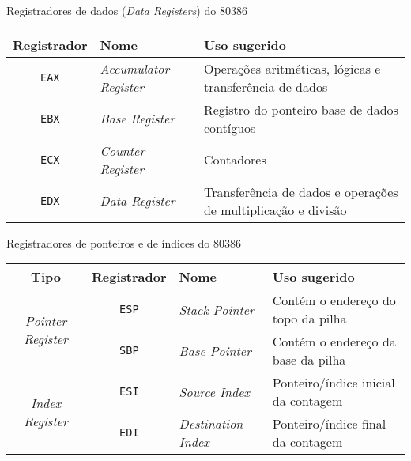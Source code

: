 \begin{frame}[fragile]{Registradores de dados ({\it Data Registers}) do 80386}

    \begin{table}[ht]
        \centering

        \begin{tabularx}{\textwidth}{clX}
            \toprule
            \textbf{Registrador} & \textbf{Nome} & \textbf{Uso sugerido} \\
            \midrule
            \texttt{EAX} & \textit{Accumulator Register} & Operações aritméticas, lógicas e 
                                                            transferência de dados \\
            \midrule
            \texttt{EBX} & \textit{Base Register} & Registro do ponteiro base de dados contíguos \\
            \midrule
            \texttt{ECX} & \textit{Counter Register} & Contadores \\
            \midrule
            \texttt{EDX} & \textit{Data Register} & Transferência de dados e operações de multiplicação e divisão \\
            \bottomrule
        \end{tabularx}
    \end{table}

\end{frame}

\begin{frame}[fragile]{Registradores de ponteiros e de índices do 80386}

    \begin{table}[ht]
        \centering

        \begin{tabularx}{1.01\textwidth}{cclX}
            \toprule
            \textbf{Tipo} & \textbf{Registrador} & \textbf{Nome} & \textbf{Uso sugerido} \\
            \midrule
            \multirow{2}{*}[-2em]{\it Pointer Register} & \texttt{ESP} & \textit{Stack Pointer} & Contém 
                                                    o endereço do topo da pilha \\
            & \cellcolor[gray]{0.9}\texttt{SBP} & \cellcolor[gray]{0.9}\textit{Base Pointer} & \cellcolor[gray]{0.9}Contém o endereço da base da pilha \\
            \midrule
            \multirow{2}{*}[-2em]{\it Index Register} & \texttt{ESI} & \textit{Source Index} & 
                Ponteiro/índice inicial da contagem  \\
            & \cellcolor[gray]{0.9}\texttt{EDI} & \cellcolor[gray]{0.9}\textit{Destination Index} &
                \cellcolor[gray]{0.9} Ponteiro/índice final da contagem \\
            \bottomrule
        \end{tabularx}
    \end{table}

\end{frame}
